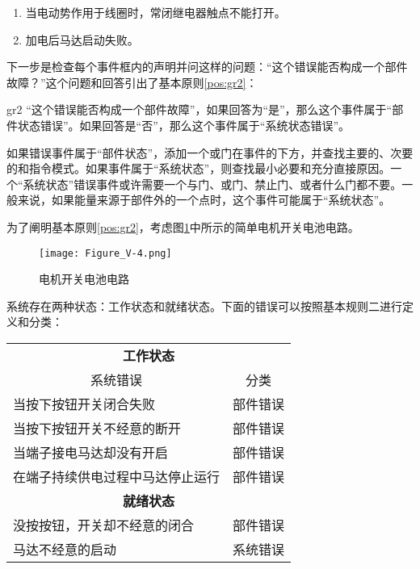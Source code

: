 \documentclass[cn,11pt,chinese]{elegantbook}
\begin{document}
\begin{enumerate}
	\item 当电动势作用于线圈时，常闭继电器触点不能打开。
	\item 加电后马达启动失败。
\end{enumerate}


下一步是检查每个事件框内的声明并问这样的问题：“这个错误能否构成一个部件故障？”这个问题和回答引出了基本原则\ref{pos:gr2}：

\begin{postulate}{}{gr2}
	“这个错误能否构成一个部件故障”，如果回答为“是”，那么这个事件属于“部件状态错误”。如果回答是“否”，那么这个事件属于“系统状态错误”。
\end{postulate}

如果错误事件属于“部件状态”，添加一个或门在事件的下方，并查找主要的、次要的和指令模式。如果事件属于“系统状态”，则查找最小必要和充分直接原因。一个“系统状态”错误事件或许需要一个与门、或门、禁止门、或者什么门都不要。一般来说，如果能量来源于部件外的一个点时，这个事件可能属于“系统状态”。

为了阐明基本原则\ref{pos:gr2}，考虑图\ref{fig:fig5_4}中所示的简单电机开关电池电路。

\begin{figure}[h]
	\centering
	\texttt{[image: Figure\_V-4.png]}
	\caption{电机开关电池电路}\label{fig:fig5_4}
\end{figure}

系统存在两种状态：工作状态和就绪状态。下面的错误可以按照基本规则二进行定义和分类：


\begin{table}[H]
	\centering
	\begin{tabular}{@{}ll@{}}
		\multicolumn{2}{c}{\textbf{工作状态}}                 \\
		\multicolumn{1}{c}{系统错误} & \multicolumn{1}{c}{分类} \\
		当按下按钮开关闭合失败              & 部件错误                   \\
		当按下按钮开关不经意的断开            & 部件错误                   \\
		当端子接电马达却没有开启             & 部件错误                   \\
		在端子持续供电过程中马达停止运行         & 部件错误                   \\
		\multicolumn{2}{c}{\textbf{就绪状态}}                 \\
		没按按钮，开关却不经意的闭合           & 部件错误                   \\
		马达不经意的启动                 & 系统错误                  
	\end{tabular}
\end{table}
 
\end{document}

